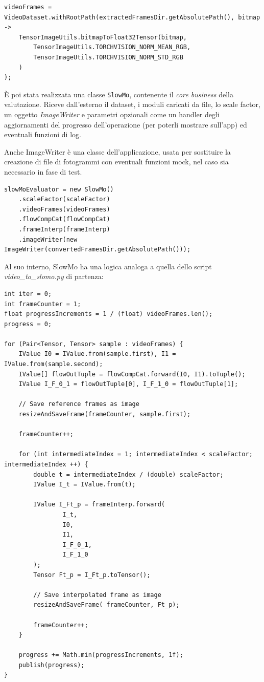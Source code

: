 \begin{lstlisting}
videoFrames = VideoDataset.withRootPath(extractedFramesDir.getAbsolutePath(), bitmap ->
    TensorImageUtils.bitmapToFloat32Tensor(bitmap,
        TensorImageUtils.TORCHVISION_NORM_MEAN_RGB,
        TensorImageUtils.TORCHVISION_NORM_STD_RGB
    )
);
\end{lstlisting}

È poi stata realizzata una classe \texttt{SlowMo}, contenente il \emph{core business} della
valutazione. Riceve dall'esterno il dataset, i moduli caricati da file, lo scale factor, 
un oggetto \emph{ImageWriter} e parametri opzionali come un handler degli aggiornamenti 
del progresso dell'operazione (per poterli mostrare sull'app) ed eventuali funzioni di log.

Anche ImageWriter è una classe dell'applicazione, usata per sostituire la creazione di file di
fotogrammi con eventuali funzioni mock, nel caso sia necessario in fase di test.

\begin{lstlisting}
slowMoEvaluator = new SlowMo()
    .scaleFactor(scaleFactor)
    .videoFrames(videoFrames)
    .flowCompCat(flowCompCat)
    .frameInterp(frameInterp)
    .imageWriter(new ImageWriter(convertedFramesDir.getAbsolutePath()));
\end{lstlisting}

Al suo interno, SlowMo ha una logica analoga a quella dello script \emph{video\_to\_slomo.py}
di partenza:

\begin{lstlisting}
int iter = 0;
int frameCounter = 1;
float progressIncrements = 1 / (float) videoFrames.len();
progress = 0;

for (Pair<Tensor, Tensor> sample : videoFrames) {
    IValue I0 = IValue.from(sample.first), I1 = IValue.from(sample.second);
    IValue[] flowOutTuple = flowCompCat.forward(I0, I1).toTuple();
    IValue I_F_0_1 = flowOutTuple[0], I_F_1_0 = flowOutTuple[1];

    // Save reference frames as image
    resizeAndSaveFrame(frameCounter, sample.first);

    frameCounter++;

    for (int intermediateIndex = 1; intermediateIndex < scaleFactor; intermediateIndex ++) {
        double t = intermediateIndex / (double) scaleFactor;
        IValue I_t = IValue.from(t);

        IValue I_Ft_p = frameInterp.forward(
                I_t,
                I0,
                I1,
                I_F_0_1,
                I_F_1_0
        );
        Tensor Ft_p = I_Ft_p.toTensor();

        // Save interpolated frame as image
        resizeAndSaveFrame( frameCounter, Ft_p);

        frameCounter++;
    }

    progress += Math.min(progressIncrements, 1f);
    publish(progress);
}
\end{lstlisting}

